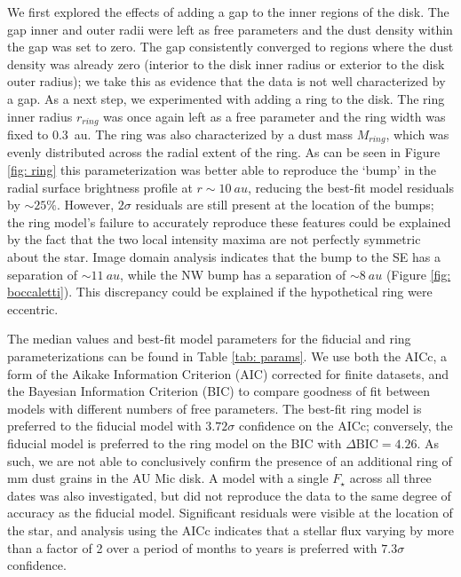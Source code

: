 \documentclass[12pt,oneside]{book}
\begin{document}
We first explored the effects of adding a gap  to the inner regions of the disk. 
The gap inner and outer radii were left as free parameters and the dust density within the gap was set to zero.
The gap consistently converged to regions where the dust density was already zero (interior to the disk inner radius or exterior to the disk outer radius); we take this as evidence that the data is not well characterized by a gap.
As a next step, we experimented with adding a ring to the disk. 
The ring inner radius $r_{ring}$ was once again left as a free parameter and the ring width was fixed to \SI{0.3}{au}.
The ring was also characterized by a dust mass $M_{ring}$, which was evenly distributed across the radial extent of the ring. 
As can be seen in Figure \ref{fig: ring} this parameterization was better able to reproduce the `bump' in the radial surface brightness profile at $r \sim \SI{10}{au}$, reducing the best-fit model residuals by $\sim 25 \%$. 
However, $2 \sigma$ residuals are still present at the location of the bumps; the ring model's failure to accurately reproduce these features could be explained by the fact that the two local intensity maxima are not perfectly symmetric about the star. 
Image domain analysis indicates that the bump to the SE has a separation of $\sim \SI{11}{au}$, while the NW bump has a separation of $\sim \SI{8}{au}$  (Figure \ref{fig: boccaletti}). 
This discrepancy could be explained if the hypothetical ring were eccentric.


The median values and best-fit model parameters for the fiducial and ring parameterizations can be found in Table \ref{tab: params}. 
We use both the AICc, a form of the Aikake Information Criterion (AIC) corrected for finite datasets, and the Bayesian Information Criterion (BIC) to compare goodness of fit between models with different numbers of free parameters.  
The best-fit ring model is preferred to the fiducial model with $3.72 \sigma$ confidence on the AICc; conversely, the fiducial model is preferred to the ring model on the BIC with $\Delta \text{BIC} = 4.26$.
As such, we are not able to conclusively confirm the presence of an additional ring of mm dust grains in the AU Mic disk.
A model with a single $F_\star$ across all three dates was also investigated, but did not reproduce the data to the same degree of accuracy as the fiducial model.
Significant residuals were visible at the location of the star, and analysis using the AICc indicates that a stellar flux varying by more than a factor of 2 over a period of months to years is preferred with $7.3 \sigma$ confidence.
\end{document}
